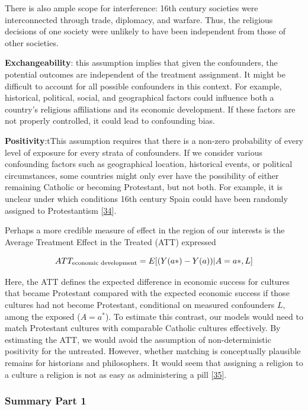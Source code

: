 \documentclass[
  singlecolumn]{article}
\begin{document}
There is also ample scope for interference: 16th century societies were
interconnected through trade, diplomacy, and warfare. Thus, the
religious decisions of one society were unlikely to have been
independent from those of other societies.

\textbf{Exchangeability}: this assumption implies that given the
confounders, the potential outcomes are independent of the treatment
assignment. It might be difficult to account for all possible
confounders in this context. For example, historical, political, social,
and geographical factors could influence both a country's religious
affiliations and its economic development. If these factors are not
properly controlled, it could lead to confounding bias.

\textbf{Positivity}:tThis assumption requires that there is a non-zero
probability of every level of exposure for every strata of confounders.
If we consider various confounding factors such as geographical
location, historical events, or political circumstances, some countries
might only ever have the possibility of either remaining Catholic or
becoming Protestant, but not both. For example, it is unclear under
which conditions 16th century Spain could have been randomly assigned to
Protestantism {[}\protect\hyperlink{ref-nalle1987}{34}{]}.

Perhaps a more credible measure of effect in the region of our interests
is the Average Treatment Effect in the Treated (ATT) expressed

\[ATT_{\textnormal{economic~development}} = E[(Y(a*)- Y(a))|A = a*,L]\]

Here, the ATT defines the expected difference in economic success for
cultures that became Protestant compared with the expected economic
success if those cultures had not become Protestant, conditional on
measured confounders \(L\), among the exposed (\(A = a^*\)). To estimate
this contrast, our models would need to match Protestant cultures with
comparable Catholic cultures effectively. By estimating the ATT, we
would avoid the assumption of non-deterministic positivity for the
untreated. However, whether matching is conceptually plausible remains
for historians and philosophers. It would seem that assigning a religion
to a culture a religion is not as easy as administering a pill
{[}\protect\hyperlink{ref-watts2018}{35}{]}.

\hypertarget{summary-part-1}{%
\subsubsection{Summary Part 1}\label{summary-part-1}}
\end{document}
